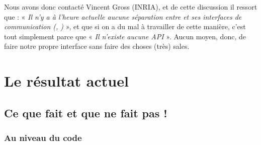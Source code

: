 		Nous avons donc contacté Vincent Gross (INRIA), et de cette discussion il ressort que : « \emph{Il n'y a à l'heure actuelle aucune séparation entre \coq{} et ses interfaces de communication (\coqtop{}, \coqide{})} », et que si on a du mal à travailler de cette manière, c'est tout simplement parce que « \emph{Il n'existe aucune API} ».
		Aucun moyen, donc, de faire notre propre interface sans faire des choses (très) sales.
				
\section{Le résultat actuel}

    \subsection{Ce que \coquille{} fait et que \coqide{} ne fait pas !}
    
        \subsubsection{Au niveau du code}
        
